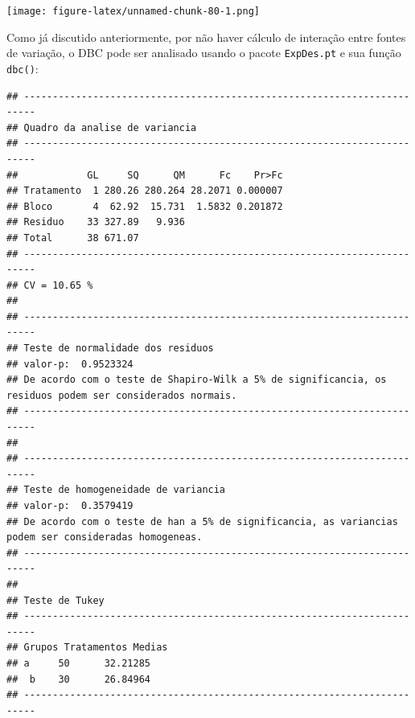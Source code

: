 \documentclass[
]{article}
\newenvironment{Shaded}{\begin{snugshade}}{\end{snugshade}}
\newcommand{\DataTypeTok}[1]{\textcolor[rgb]{0.13,0.29,0.53}{#1}}
\newcommand{\DecValTok}[1]{\textcolor[rgb]{0.00,0.00,0.81}{#1}}
\newcommand{\KeywordTok}[1]{\textcolor[rgb]{0.13,0.29,0.53}{\textbf{#1}}}
\newcommand{\NormalTok}[1]{#1}
\newcommand{\OperatorTok}[1]{\textcolor[rgb]{0.81,0.36,0.00}{\textbf{#1}}}
\newcommand{\StringTok}[1]{\textcolor[rgb]{0.31,0.60,0.02}{#1}}
\begin{document}
\begin{Shaded}
\end{Shaded}

\texttt{[image: figure-latex/unnamed-chunk-80-1.png]}

Como já discutido anteriormente, por não haver cálculo de interação entre fontes de variação, o DBC pode ser analisado usando o pacote \texttt{ExpDes.pt} e sua função \texttt{dbc()}:

\begin{Shaded}
\end{Shaded}

\begin{verbatim}
## ------------------------------------------------------------------------
## Quadro da analise de variancia
## ------------------------------------------------------------------------
##            GL     SQ      QM      Fc    Pr>Fc
## Tratamento  1 280.26 280.264 28.2071 0.000007
## Bloco       4  62.92  15.731  1.5832 0.201872
## Residuo    33 327.89   9.936                 
## Total      38 671.07                         
## ------------------------------------------------------------------------
## CV = 10.65 %
## 
## ------------------------------------------------------------------------
## Teste de normalidade dos residuos 
## valor-p:  0.9523324 
## De acordo com o teste de Shapiro-Wilk a 5% de significancia, os residuos podem ser considerados normais.
## ------------------------------------------------------------------------
## 
## ------------------------------------------------------------------------
## Teste de homogeneidade de variancia 
## valor-p:  0.3579419 
## De acordo com o teste de han a 5% de significancia, as variancias podem ser consideradas homogeneas.
## ------------------------------------------------------------------------
## 
## Teste de Tukey
## ------------------------------------------------------------------------
## Grupos Tratamentos Medias
## a     50      32.21285 
##  b    30      26.84964 
## ------------------------------------------------------------------------
\end{verbatim}
\end{document}
